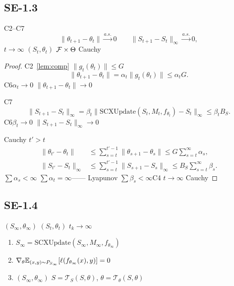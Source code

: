 \subsection{ SE-1.3}

\begin{lemma}[]\label{lem:displacement}
 C2--C7 
\begin{equation}
    \|\theta_{t+1} - \theta_t\| \xrightarrow{a.s.} 0 \quad \text{} \quad \|S_{t+1} - S_t\|_\infty \xrightarrow{a.s.} 0,
\end{equation}
 $t \to \infty$ $(S_t, \theta_t)$  $\mathcal{F} \times \Theta$  Cauchy 
\end{lemma}

\begin{proof}
 C2~\ref{lem:comp} $\|g_t(\theta_t)\| \leq G$
\begin{equation}
    \|\theta_{t+1} - \theta_t\| = \alpha_t \|g_t(\theta_t)\| \leq \alpha_t G.
\end{equation}
 C6$\alpha_t \to 0$ $\|\theta_{t+1} - \theta_t\| \to 0$

 C7
\begin{equation}
    \|S_{t+1} - S_t\|_\infty = \beta_t \|\text{SCXUpdate}(S_t, M_t, f_{\theta_t}) - S_t\|_\infty \leq \beta_t B_S.
\end{equation}
 C6$\beta_t \to 0$ $\|S_{t+1} - S_t\|_\infty \to 0$

 Cauchy  $t' > t$
\begin{align}
    \|\theta_{t'} - \theta_t\| &\leq \sum_{s=t}^{t'-1} \|\theta_{s+1} - \theta_s\| \leq G \sum_{s=t}^{\infty} \alpha_s, \\
    \|S_{t'} - S_t\|_\infty &\leq \sum_{s=t}^{t'-1} \|S_{s+1} - S_s\|_\infty \leq B_S \sum_{s=t}^{\infty} \beta_s.
\end{align}
 $\sum \alpha_s < \infty$ $\sum \alpha_t = \infty$—— Lyapunov  $\sum \beta_s < \infty$C4 $t \to \infty$  Cauchy 
\end{proof}

\subsection{ SE-1.4}

\begin{lemma}[]\label{lem:fixed-point}
 $(S_\infty, \theta_\infty)$  $(S_t, \theta_t)$ $t_k \to \infty$
\begin{enumerate}[label=(\alph*), nosep]
    \item \textbf{} $S_\infty = \text{SCXUpdate}(S_\infty, M_\infty, f_{\theta_\infty})$
    \item \textbf{} $\nabla_\theta \mathbb{E}_{(x,y) \sim P_{S_\infty}}[\ell(f_{\theta_\infty}(x), y)] = 0$
    \item \textbf{} $(S_\infty, \theta_\infty)$  $S = \mathcal{T}_S(S, \theta)$, $\theta = \mathcal{T}_\theta(S, \theta)$ 
\end{enumerate}
\end{lemma}

